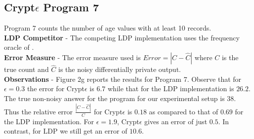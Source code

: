 \subsection*{Crypt$\epsilon$ Program 7}
Program 7 counts the number of age values with at least 10 records.  
\\\textbf{\textsf{LDP} Competitor} - The competing \textsf{LDP} implementation uses the frequency oracle of \cite{LDP1}. 
\\\textbf{Error Measure} - The error measure used is  $Error = |C-\hat{C}|$ where $C$ is the true count and $\hat{C}$ is the noisy differentially private output. 
\\\textbf{Observations} - Figure 2g reports the results for Program 7. Observe that for $\epsilon=0.3$ the error for Crypt$\epsilon$ is $6.7$ while that for the \textsf{LDP} implementation is $26.2$. The true non-noisy answer for the program for our experimental setup is $38$. Thus the relative error $\frac{|C-\hat{C}|}{C}$ for Crypt$\epsilon$ is $0.18$ as compared to that of $0.69$ for the \textsf{LDP} implementation.  For $\epsilon=1.9$, Crypt$\epsilon$ gives an error of just $0.5$. In contrast,  for \textsf{LDP} we still get an error of $10.6$. 

